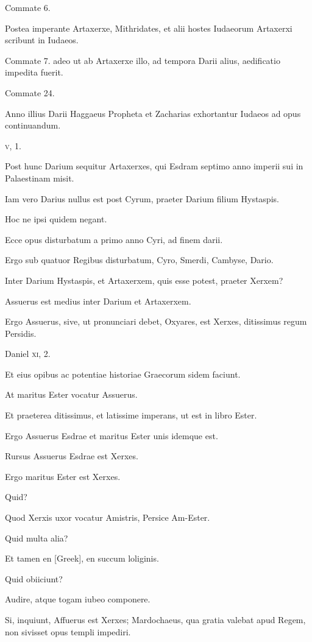 \begin{parnumbers}
Commate 6.

Postea imperante Artaxerxe, Mithridates,
et alii hostes Iudaeorum Artaxerxi scribunt in Iudaeos.

Commate 7.
adeo ut ab Artaxerxe illo, ad tempora Darii alius, aedificatio impedita
fuerit.

Commate 24.

Anno illius Darii Haggaeus Propheta
et Zacharias exhortantur Iudaeos ad opus continuandum.

\textsc{v}, 1.

Post hunc Darium sequitur Artaxerxes, qui Esdram septimo anno
imperii sui in Palaestinam misit.

Iam vero Darius nullus est post Cyrum,
praeter Darium filium Hystaspis.

Hoc ne ipsi quidem negant.

Ecce opus disturbatum a primo anno Cyri, ad finem darii.

Ergo sub quatuor Regibus disturbatum, Cyro, Smerdi, Cambyse,
Dario.

Inter Darium Hystaspis, et Artaxerxem, quis esse potest,
praeter Xerxem?

Assuerus est medius inter Darium et Artaxerxem.

Ergo Assuerus, sive, ut pronunciari debet, Oxyares, est Xerxes, ditissimus
regum Persidis.

Daniel \textsc{xi}, 2.

Et eius opibus ac potentiae historiae
Graecorum sidem faciunt.

At maritus Ester vocatur Assuerus.

Et praeterea ditissimus, et latissime imperans, ut est in libro
Ester.

Ergo Assuerus Esdrae et maritus Ester unis idemque est.

Rursus Assuerus Esdrae est Xerxes.

Ergo maritus Ester est Xerxes.

Quid?

Quod Xerxis uxor vocatur Amistris, Persice Am-Ester.

Quid multa alia?

Et tamen en \textgreek{[Greek]}, en succum loliginis.

Quid obiiciunt?

Audire, atque togam iubeo componere.

Si, inquiunt, Affuerus est Xerxes;
Mardochaeus, qua gratia valebat apud Regem, non sivisset opus
templi impediri.


\end{parnumbers}
